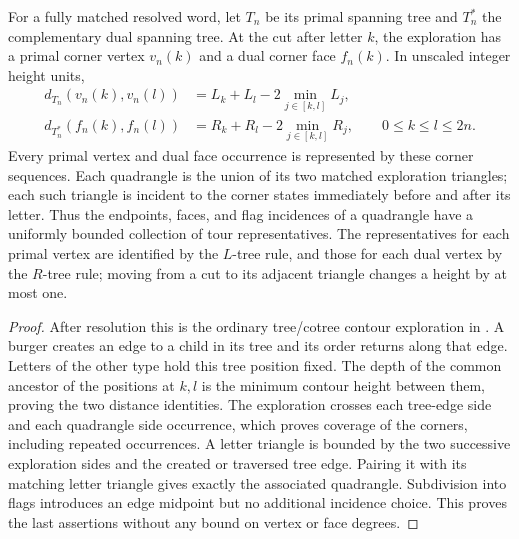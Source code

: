 \begin{lemma}\label{enc:incidence}
For a fully matched resolved word, let $T_n$ be its primal spanning tree
and $T_n^*$ the complementary dual spanning tree.  At the cut after
letter $k$, the exploration has a primal corner vertex $v_n(k)$ and a
dual corner face $f_n(k)$.  In unscaled integer height units,
\begin{align*}
 d_{T_n}(v_n(k),v_n(l))
 &=L_k+L_l-2\min_{j\in[k,l]}L_j,\\
 d_{T_n^*}(f_n(k),f_n(l))
 &=R_k+R_l-2\min_{j\in[k,l]}R_j,
 \qquad 0\le k\le l\le2n.
\end{align*}
Every primal vertex and dual face occurrence is represented by these
corner sequences.  Each quadrangle is the union of its two matched
exploration triangles; each such triangle is incident to the corner
states immediately before and after its letter.  Thus the endpoints,
faces, and flag incidences of a quadrangle have a uniformly bounded
collection of tour representatives.  The representatives for each
primal vertex are identified by the $L$-tree rule, and those for each
dual vertex by the $R$-tree rule; moving from a cut to its adjacent
triangle changes a height by at most one.
\end{lemma}

\begin{proof}
After resolution this is the ordinary tree/cotree contour exploration
in \cite[Section 4.1, Figures 6--7]{SheffieldInventory}.  A burger
creates an edge to a child in its tree and its order returns along
that edge.  Letters of the other type hold this tree position fixed.
The depth of the common ancestor of the positions at $k,l$ is the
minimum contour height between them, proving the two distance
identities.  The exploration crosses each tree-edge side and each
quadrangle side occurrence, which proves coverage of the corners,
including repeated occurrences.  A letter triangle is bounded by the
two successive exploration sides and the created or traversed tree
edge.  Pairing it with its matching letter triangle gives exactly the
associated quadrangle.  Subdivision into flags introduces an edge
midpoint but no additional incidence choice.  This proves the last
assertions without any bound on vertex or face degrees.
\end{proof}

